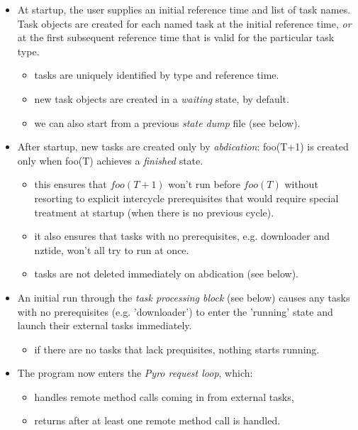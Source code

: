 \documentclass[12pt]{article}
\begin{document}
\begin{itemize}
    \item At startup, the user supplies an initial reference time and
    list of task names. Task objects are created for each named task at
    the initial reference time, {\em or} at the first subsequent
    reference time that is valid for the particular task type.
    \begin{itemize}
        \item tasks are uniquely identified by type and reference time. 
        \item new task objects are created in a {\em waiting} state, by
        default.
        \item we can also start from a previous {\em state dump} file
        (see below).
    \end{itemize}

\item After startup, new tasks are created only by {\em abdication}:
foo(T+1) is created only when foo(T) achieves a {\em finished} state.
    \begin{itemize}
    \item this ensures that $foo(T+1)$ won't run before $foo(T)$ without
    resorting to explicit intercycle prerequisites that would require
    special treatment at startup (when there is no previous cycle). 
    \item it also ensures that tasks with no prerequisites, e.g.
    downloader and nztide, won't all try to run at once.
    \item tasks are not deleted immediately on abdication (see below). 
    \end{itemize}

\item An initial run through the {\em task processing block} (see below)
causes any tasks with no prerequisites (e.g. 'downloader') to enter the
'running' state and launch their external tasks immediately.
    \begin{itemize}
    \item if there are no tasks that lack prequisites, nothing starts running.
    \end{itemize}

\item The program now enters the {\em Pyro request loop}, which:

    \begin{itemize}
    \item handles remote method calls coming in from external tasks, 
    \item returns after at least one remote method call is handled. 
    \end{itemize}


\end{itemize}
\end{document}
